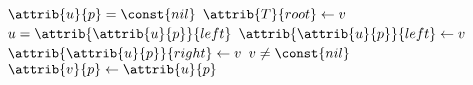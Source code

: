 \begin{codebox}
\li \If $\attrib{u}{p} = \const{nil}$
\li \Then
        $\attrib{T}{root} \gets v$
\li \Else
\li     \If $u = \attrib{\attrib{u}{p}}{left}$
\li     \Then
            $\attrib{\attrib{u}{p}}{left} \gets v$
\li     \Else
\li         $\attrib{\attrib{u}{p}}{right} \gets v$
        \End
    \End
\li \If $v \neq \const{nil}$
\li \Then
        $\attrib{v}{p} \gets \attrib{u}{p}$
    \End
\end{codebox}